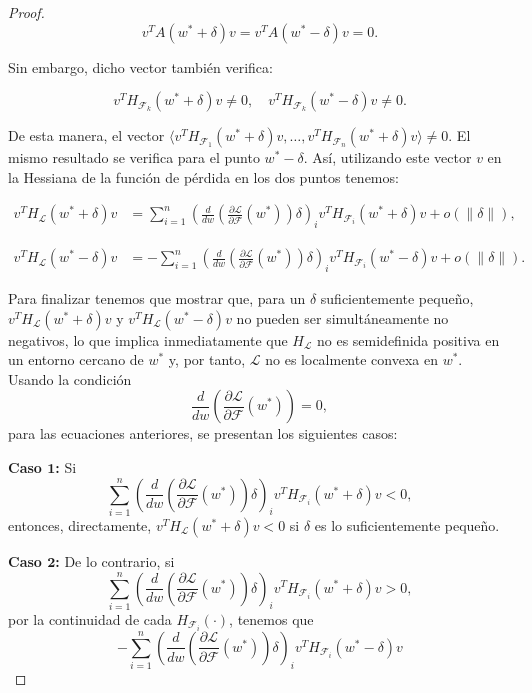\begin{proof}
    \[
        v^T A( w^* + \delta)  v =  v^T A( w^* - \delta)  v = 0.
    \]

    Sin embargo, dicho vector también verifica:

    \[
        v^T H_{\mathcal{F}_k}( w^* + \delta)  v \neq 0, \quad  v^T H_{\mathcal{F}_k}( w^* - \delta)  v \neq 0.
    \]

    De esta manera, el vector $ \langle v^T H_{\mathcal{F}_1}( w^*+\delta)  v, \dots,  v^T H_{\mathcal{F}_n}( w^*+\delta)  v \rangle \neq 0$. El mismo resultado se verifica para el punto $w^* - \delta$. Así, utilizando este vector $v$ en la Hessiana de la función de pérdida en los dos puntos tenemos:

    \begin{align}
        v^T H_{\mathcal{L}}( w^* + \delta)v &=  
        \sum_{i=1}^{n} \left( \frac{d}{d w} \left( \frac{\partial \mathcal{L}}{\partial \mathcal{F}}( w^*) \right) \delta \right)_i v^T H_{\mathcal{F}_i}( w^* + \delta) v + o(\|\delta\|),
    \end{align}

    \begin{align}
        v^T H_{\mathcal{L}}( w^* - \delta)v &=  
        - \sum_{i=1}^{n} \left( \frac{d}{d w} \left( \frac{\partial \mathcal{L}}{\partial \mathcal{F}}( w^*) \right) \delta \right)_i v^T H_{\mathcal{F}_i}( w^* - \delta) v + o(\|\delta\|).
    \end{align}

    Para finalizar tenemos que mostrar que, para un $\delta$ suficientemente pequeño, $v^T H_{\mathcal{L}}(w^* + \delta) v$ y $v^T H_{\mathcal{L}}(w^* - \delta) v$ no pueden ser simultáneamente no negativos, lo que implica inmediatamente que $H_{\mathcal{L}}$ no es semidefinida positiva en un entorno cercano de $w^*$ y, por tanto, $\mathcal{L}$ no es localmente convexa en $w^*$. Usando la condición 
    \[
    \frac{d}{dw} (\frac{\partial \mathcal{L}}{\partial \mathcal{F}}(w^*)) = 0,
    \]
    para las ecuaciones anteriores, se presentan los siguientes casos:

    \textbf{Caso $\boldsymbol{1}$:} Si 
    \[
    \sum_{i=1}^{n} \left( \frac{d}{dw} (\frac{\partial \mathcal{L}}{\partial \mathcal{F}}(w^*))\delta \right)_i v^T H_{\mathcal{F}_i}(w^* + \delta) v < 0,
    \]
    entonces, directamente, $v^T H_{\mathcal{L}}(w^* + \delta) v < 0$ si $\delta$ es lo suficientemente pequeño.

    \textbf{Caso $\boldsymbol{2}$:} De lo contrario, si 
    \[
    \sum_{i=1}^{n} \left( \frac{d}{dw} (\frac{\partial \mathcal{L}}{\partial \mathcal{F}}(w^*))\delta \right)_i v^T H_{\mathcal{F}_i}(w^* + \delta) v > 0,
    \]
    por la continuidad de cada $H_{\mathcal{F}_i}(\cdot)$, tenemos que
    \[
        -\sum_{i=1}^{n} \left( \frac{d}{dw} (\frac{\partial \mathcal{L}}{\partial \mathcal{F}}(w^*))\delta \right)_i v^T H_{\mathcal{F}_i}(w^* - \delta) v
    \]


\end{proof}
